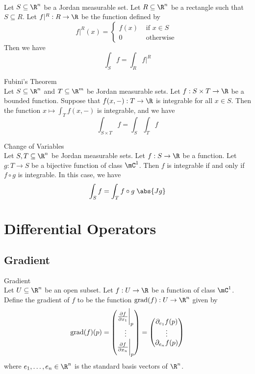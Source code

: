 \documentclass[a4paper]{article}
\begin{document}
\begin{prp}{}{}\\
Let $S\subseteq\R^n$ be a Jordan measurable set. Let $R\subseteq\R^n$ be a rectangle such that $S\subseteq R$. Let $f|^R:R\to\R$ be the function defined by $$f|^R(x)=\begin{cases}
f(x) & \text{ if }x\in S\\
0 & \text{ otherwise }
\end{cases}$$ Then we have $$\int_Sf=\int_Rf|^R$$
\end{prp}

\begin{thm}{Fubini's Theorem}{}\\
Let $S\subseteq\R^n$ and $T\subseteq\R^m$ be Jordan measurable sets. Let $f:S\times T\to\R$ be a bounded function. Suppose that $f(x,-):T\to\R$ is integrable for all $x\in S$. Then the function $x\mapsto\int_T f(x,-)$ is integrable, and we have $$\int_{S\times T}f=\int_S\int_Tf$$
\end{thm}

\begin{thm}{Change of Variables}{}\\
Let $S,T\subseteq\R^n$ be Jordan measurable sets. Let $f:S\to\R$ be a function. Let $g:T\to S$ be a bijective function of class $\mC^1$. Then $f$ is integrable if and only if $f\circ g$ is integrable. In this case, we have $$\int_Sf=\int_Tf\circ g\;\abs{Jg}$$
\end{thm}

\pagebreak
\section{Differential Operators}
\subsection{Gradient}
\begin{defn}{Gradient}{}\\
Let $U\subseteq\R^n$ be an open subset. Let $f:U\to\R$ be a function of class $\mC^1$. Define the gradient of $f$ to be the function $\text{grad}(f):U\to\R^n$ given by $$\text{grad}(f)(p)=\begin{pmatrix}
\frac{\partial f}{\partial x_1}\bigg{|}_p\\\vdots\\\frac{\partial f}{\partial x_n}\bigg{|}_p
\end{pmatrix}=\begin{pmatrix}
\partial_{e_1}f(p)\\\vdots\\\partial_{e_n}f(p)
\end{pmatrix}$$ where $e_1,\dots,e_n\in\R^n$ is the standard basis vectors of $\R^n$. 
\end{defn}
\end{document}
